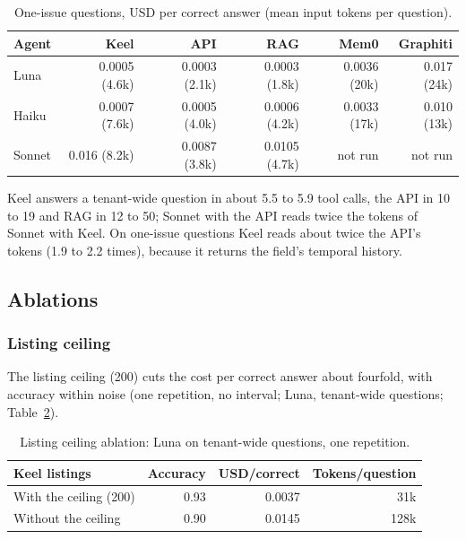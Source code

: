 \documentclass[sigconf, nonacm]{acmart}
\begin{document}
\begin{table}[t]
\caption{One-issue questions, USD per correct answer (mean input tokens per question).}
\label{tab:oneissue-cost}
\centering
\footnotesize
\setlength{\tabcolsep}{3.5pt}
\begin{tabular}{l r r r r r}
\toprule
Agent & Keel & API & RAG & Mem0 & Graphiti \\
\midrule
Luna & 0.0005 (4.6k) & 0.0003 (2.1k) & 0.0003 (1.8k) & 0.0036 (20k) & 0.017 (24k) \\
Haiku & 0.0007 (7.6k) & 0.0005 (4.0k) & 0.0006 (4.2k) & 0.0033 (17k) & 0.010 (13k) \\
Sonnet & 0.016 (8.2k) & 0.0087 (3.8k) & 0.0105 (4.7k) & not run & not run \\
\bottomrule
\end{tabular}
\end{table}

Keel answers a tenant-wide question in about 5.5 to 5.9 tool calls, the API in 10 to 19 and RAG in 12 to 50; Sonnet with the API reads twice the tokens of Sonnet with Keel. On one-issue questions Keel reads about twice the API's tokens (1.9 to 2.2 times), because it returns the field's temporal history.

\subsection{Ablations}
\label{sec:ablations}

\subsubsection*{Listing ceiling}

The listing ceiling (200) cuts the cost per correct answer about fourfold, with accuracy within noise (one repetition, no interval; Luna, tenant-wide questions; Table~\ref{tab:ceiling}).

\begin{table}[t]
\caption{Listing ceiling ablation: Luna on tenant-wide questions, one repetition.}
\label{tab:ceiling}
\centering
\footnotesize
\setlength{\tabcolsep}{3.5pt}
\begin{tabular}{l r r r}
\toprule
Keel listings & Accuracy & USD/correct & Tokens/question \\
\midrule
With the ceiling (200) & 0.93 & 0.0037 & 31k \\
Without the ceiling & 0.90 & 0.0145 & 128k \\
\bottomrule
\end{tabular}
\end{table}
\end{document}
